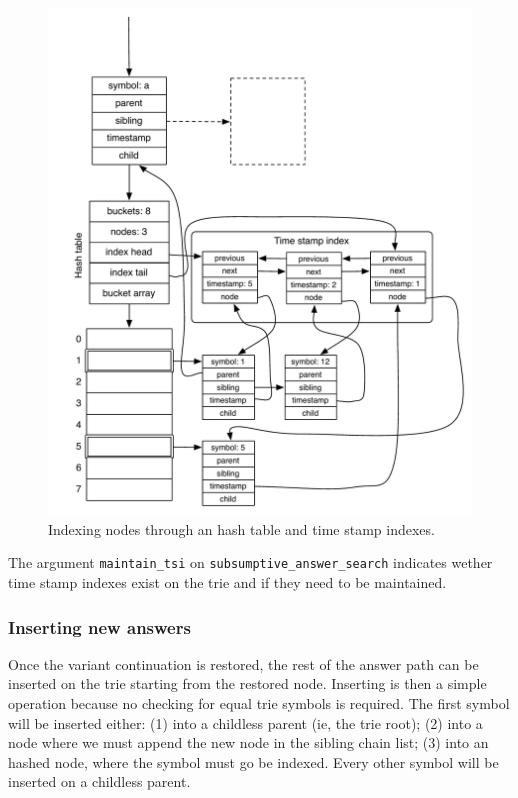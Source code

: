 \begin{figure}[ht]
  \centering
    \includegraphics[scale=0.6]{hash_table_tst.pdf}
  \caption{Indexing nodes through an hash table and time stamp indexes.}
  \label{fig:hash_table_tst}
\end{figure}

The argument \texttt{maintain\_tsi} on \texttt{subsumptive\_answer\_search} indicates wether
time stamp indexes exist on the trie and if they need to be maintained.

\subsubsection{Inserting new answers}

Once the variant continuation is restored, the rest of the answer path can be inserted on the trie starting
from the restored node. Inserting is then a simple operation because no checking for equal trie symbols is required.
The first symbol will be inserted either: (1) into a childless parent (ie, the trie root); (2) into a node where
we must append the new node in the sibling chain list; (3) into an hashed node, where the symbol must go be indexed.
Every other symbol will be inserted on a childless parent.

